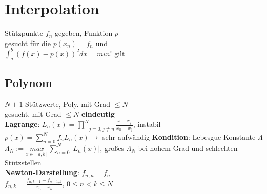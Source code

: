 \section{Interpolation}
Stützpunkte $f_n$ gegeben, Funktion $p$\\ gesucht für die $p(x_n) = f_n$ und\\
$\int_a^b (f(x) - p(x))^2dx = min!$ gilt\\
\subsection{Polynom}
$N + 1$ Stützwerte, Poly. mit Grad $\leq N$ \\gesucht,
mit Grad $\leq N$ \textbf{eindeutig}\\
\textbf{Lagrange}: 
$L_n(x) = \underset{j = 0, j \neq n}{\prod^N}\frac{x-x_j}{x_n - x_j} $, instabil\\
$p(x) = \sum_{n=0}^N f_nL_n(x) \rightarrow$ sehr aufwändig
\textbf{Kondition}: Lebesgue-Konstante $\Lambda$\\
$\Lambda_N := \underset{x \in [a,b]}{max}\sum_{n=0}^N |L_n(x)|$,
großes $\Lambda_N$ bei hohem Grad und schlechten Stützstellen\\
\textbf{Newton-Darstellung}: $f_{n,n} = f_n$\\
$f_{n,k} = \frac{f_{n,k - 1} - f_{n + 1,k}}{x_n - x_k}$, $0 \leq n < k \leq N$\\

